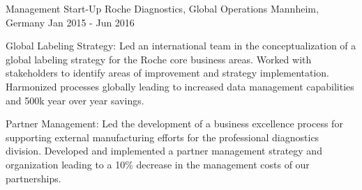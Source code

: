 


\begin{cventries}


\cventry
{Management Start-Up} %
{Roche Diagnostics, Global Operations} %
{Mannheim, Germany} %
{Jan 2015 - Jun 2016} %
{ %
\begin{cvitems}
\item {Global Labeling Strategy: Led an international team in the conceptualization of a global labeling strategy for the Roche core business areas. Worked with stakeholders to identify areas of improvement and strategy implementation. Harmonized processes globally leading to increased data management capabilities and 500k year over year savings.}
\item{Partner Management: Led the development of a business excellence process for supporting external manufacturing efforts for the professional diagnostics division. Developed and implemented a partner management strategy and organization leading to a 10\% decrease in the management costs of our partnerships.} 
\end{cvitems}
}



\end{cventries}
